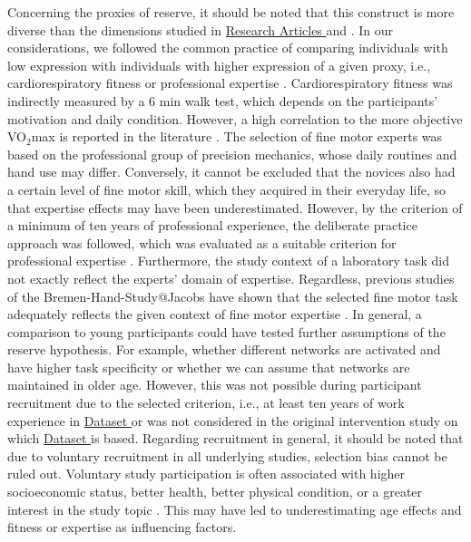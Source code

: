 Concerning the proxies of reserve, it should be noted that this construct is more diverse than the dimensions studied in \hyperref[results:paperI]{Research Articles } and \hyperref[results:paperI]{}. In our considerations, we followed the common practice of comparing individuals with low expression with individuals with higher expression of a given proxy, i.e., cardiorespiratory fitness or professional expertise \cite{Koen2019}. Cardiorespiratory fitness was indirectly measured by a 6 min walk test, which depends on the participants' motivation and daily condition. However, a high correlation to the more objective VO$_2$max is reported in the literature \cite{Zhang2017}. The selection of fine motor experts was based on the professional group of precision mechanics, whose daily routines and hand use may differ. Conversely, it cannot be excluded that the novices also had a certain level of fine motor skill, which they acquired in their everyday life, so that expertise effects may have been underestimated. However, by the criterion of a minimum of ten years of professional experience, the deliberate practice approach was followed, which was evaluated as a suitable criterion for professional expertise \cite{Ericsson1991, Voelcker-Rehage2013}. Furthermore, the study context of a laboratory task did not exactly reflect the experts' domain of expertise. Regardless, previous studies of the Bremen-Hand-Study@Jacobs have shown that the selected fine motor task adequately reflects the given context of fine motor expertise \cite{Vieluf2018, Goelz2018, Vieluf2012, Vieluf2013}. In general, a comparison to young participants could have tested further assumptions of the reserve hypothesis. For example, whether different networks are activated and have higher task specificity or whether we can assume that networks are maintained in older age. However, this was not possible during participant recruitment due to the selected criterion, i.e., at least ten years of work experience in \hyperref[methods:datasets:I]{Dataset } or was not considered in the original intervention study on which \hyperref[methods:datasets:III]{Dataset } is based. Regarding recruitment in general, it should be noted that due to voluntary recruitment in all underlying studies, selection bias cannot be ruled out. Voluntary study participation is often associated with higher socioeconomic status, better health, better physical condition, or a greater interest in the study topic \cite{Ganguli1998, Peters-Davis2001, Dodge2014}. This may have led to underestimating age effects and fitness or expertise as influencing factors.\\
